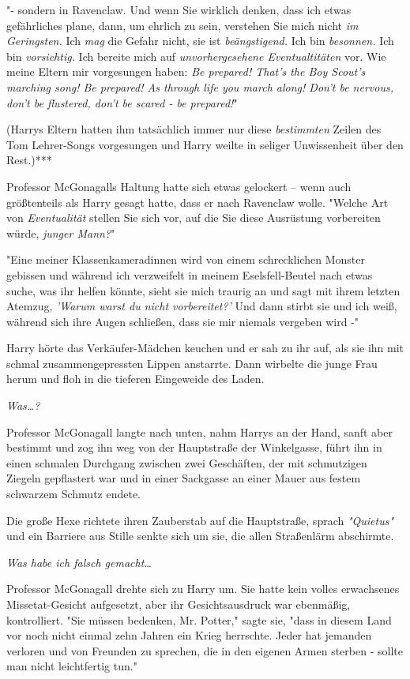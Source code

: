 {"- sondern in Ravenclaw. Und wenn Sie wirklich denken, dass ich etwas gefährliches plane, dann, um ehrlich zu sein, verstehen Sie mich nicht \emph{im Geringsten.} Ich \emph{mag} die Gefahr nicht, sie ist \emph{beängstigend.} Ich bin \emph{besonnen.} Ich bin \emph{vorsichtig.} Ich bereite mich auf \emph{unvorhergesehene Eventualtitäten} vor. Wie meine Eltern mir vorgesungen haben: \emph{Be prepared! That's the Boy Scout's marching song! Be prepared! As through life you march along! Don't be nervous, don't be flustered, don't be scared - be prepared!}"

(Harrys Eltern hatten ihm tatsächlich immer nur diese \emph{bestimmten} Zeilen des Tom Lehrer-Songs vorgesungen und Harry weilte in seliger Unwissenheit über den Rest.)***

Professor McGonagalls Haltung hatte sich etwas gelockert -- wenn auch größtenteils als Harry gesagt hatte, dass er nach Ravenclaw wolle. "Welche Art von \emph{Eventualität} stellen Sie sich vor, auf die Sie diese Ausrüstung vorbereiten würde, \emph{junger Mann?}"

"Eine meiner Klassenkameradinnen wird von einem schrecklichen Monster gebissen und während ich verzweifelt in meinem Eselsfell-Beutel nach etwas suche, was ihr helfen könnte, sieht sie mich traurig an und sagt mit ihrem letzten Atemzug, \emph{'Warum warst du nicht vorbereitet?'} Und dann stirbt sie und ich weiß, während sich ihre Augen schließen, dass sie mir niemals vergeben wird -"

Harry hörte das Verkäufer-Mädchen keuchen und er sah zu ihr auf, als sie ihn mit schmal zusammengepressten Lippen anstarrte. Dann wirbelte die junge Frau herum und floh in die tieferen Eingeweide des Laden.

\emph{Was…?}

Professor McGonagall langte nach unten, nahm Harrys an der Hand, sanft aber bestimmt und zog ihn weg von der Hauptstraße der Winkelgasse, führt ihn in einen schmalen Durchgang zwischen zwei Geschäften, der mit schmutzigen Ziegeln gepflastert war und in einer Sackgasse an einer Mauer aus festem schwarzem Schmutz endete.

Die große Hexe richtete ihren Zauberstab auf die Hauptstraße, sprach \emph{"Quietus"} und ein Barriere aus Stille senkte sich um sie, die allen Straßenlärm abschirmte.

\emph{Was habe ich falsch gemacht…}

Professor McGonagall drehte sich zu Harry um. Sie hatte kein volles erwachsenes Missetat-Gesicht aufgesetzt, aber ihr Gesichtsausdruck war ebenmäßig, kontrolliert. "Sie müssen bedenken, Mr. Potter," sagte sie, "dass in diesem Land vor noch nicht einmal zehn Jahren ein Krieg herrschte. Jeder hat jemanden verloren und von Freunden zu sprechen, die in den eigenen Armen sterben - sollte man nicht leichtfertig tun."

}
